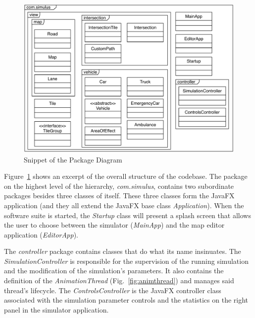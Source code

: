 \begin{figure}[t]
	\begin{center}
		\includegraphics[width=\textwidth]{img/package_diagram.pdf}
		\caption[Snippet of the Package Diagram]{Snippet of the Package Diagram}
		\label{fig:packages}
	\end{center}
\end{figure}

Figure~\ref{fig:packages} shows an excerpt of the overall structure of the codebase. The package on the highest level of the hierarchy, \textit{com.simulus}, contains two subordinate packages besides three classes of itself. These three classes form the JavaFX application (and they all extend the JavaFX base class \textit{Application}). When the software suite is started, the \textit{Startup} class will present a splash screen that allows the user to choose between the simulator (\textit{MainApp}) and the map editor application (\textit{EditorApp}).

The \textit{controller} package contains classes that do what its name insinuates. The \textit{SimulationController} is responsible for the supervision of the running simulation and the modification of the simulation's parameters.  It also contains the definition of the \textit{AnimationThread} (Fig.~\ref{fig:animthread}) and manages said thread's lifecycle. The \textit{ControlsController} is the JavaFX controller class associated with the simulation parameter controls and the statistics on the right panel in the simulator application. 


